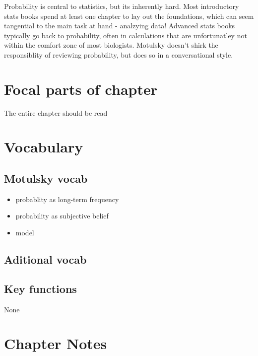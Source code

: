 \documentclass[]{book}
\providecommand{\tightlist}{%
  \setlength{\itemsep}{0pt}\setlength{\parskip}{0pt}}
\theoremstyle{definition}
\theoremstyle{definition}
\theoremstyle{definition}
\theoremstyle{remark}
\begin{document}
Probability is central to statistics, but its inherently hard. Most
introductory stats books spend at least one chapter to lay out the
foundations, which can seem tangential to the main task at hand -
analzying data! Advanced stats books typically go back to probability,
often in calculations that are unfortunatley not within the comfort zone
of most biologists. Motulsky doesn't shirk the responsiblity of
reviewing probability, but does so in a conversational style.

\section{Focal parts of chapter}\label{focal-parts-of-chapter}

The entire chapter should be read

\section*{Vocabulary}\label{vocabulary-1}

\subsection*{Motulsky vocab}\label{motulsky-vocab-1}

\begin{itemize}
\tightlist
\item
  probablity as long-term frequency
\item
  probability as subjective belief
\item
  model
\end{itemize}

\subsection*{Aditional vocab}\label{aditional-vocab}

\subsection*{Key functions}\label{key-functions-1}

None

\section*{Chapter Notes}\label{chapter-notes-1}
\end{document}

